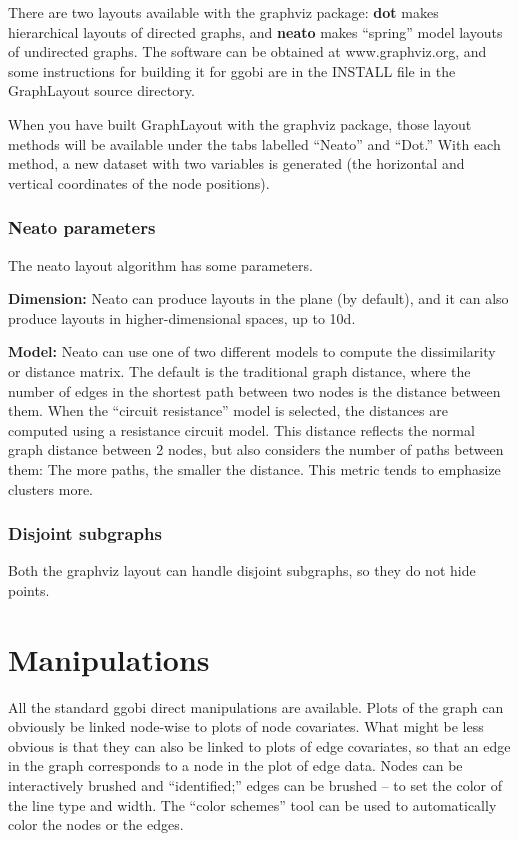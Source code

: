 \documentclass[11pt]{article}
\begin{document}
There are two layouts available with the graphviz \cite{GansnerNorth00}
package:  {\bf dot} makes hierarchical layouts of directed graphs,
and {\bf neato} makes ``spring'' model layouts of undirected graphs.
The software can be obtained at www.graphviz.org, and some instructions
for building it for ggobi are in the INSTALL file in the GraphLayout
source directory.

When you have built GraphLayout with the graphviz package, those
layout methods will be available under the tabs labelled ``Neato'' and
``Dot.''  With each method, a new dataset with two variables is generated
(the horizontal and vertical coordinates of the node positions).

\subsubsection{Neato parameters}

The neato layout algorithm has some parameters.

{\bf Dimension:}  Neato can produce layouts in the plane (by default),
and it can also produce layouts in higher-dimensional spaces, up to 10d.

{\bf Model:}  Neato can use one of two different models to compute the
dissimilarity or distance matrix.  The default is the traditional graph
distance, where the number of edges in the shortest path between two
nodes is the distance between them.  When the ``circuit resistance''
model  is selected, the distances are computed using a resistance circuit
model. This distance reflects the normal graph distance between 2 nodes,
but also considers the number of paths between them: The more paths,
the smaller the distance.  This metric tends to emphasize clusters more.

\subsubsection{Disjoint subgraphs}

Both the graphviz layout can handle disjoint subgraphs, so they
do not hide points.

\section{Manipulations}

All the standard ggobi direct manipulations are available.  Plots of
the graph can obviously be linked node-wise to plots of node covariates.
What might be less obvious is that they can also be linked to plots of
edge covariates, so that an edge in the graph corresponds to a node in the
plot of edge data.  Nodes can be interactively brushed and ``identified;''
edges can be brushed -- to set the color of the line type and width.
The ``color schemes'' tool can be used to automatically color the nodes
or the edges.
\end{document}
